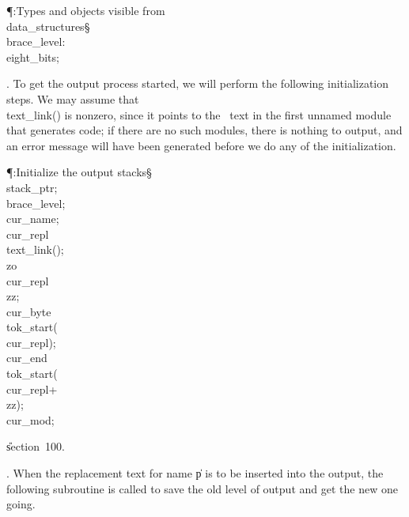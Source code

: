 \Y\P\?\4:Types and objects visible from \\{data\_structures}\X\mathrel{+}\S%
\?\6
\\{brace\_level}\?:\?\\{eight\_bits};\par
\fi

. To get the output process started, we will perform the following
initialization steps. We may assume that \\{text\_link}\?(\?)\? is nonzero,
since it
points to the \ADA\ text in the first unnamed module that generates code; if
there are no such modules, there is nothing to output, and an error message
will have been generated before we do any of the initialization.

\Y\P\?\4:Initialize the output stacks\X\S\?\6
\\{stack\_ptr}\?\K{};\5
\\{brace\_level}\?\K{};\5
\\{cur\_name}\?\K{};\5
\\{cur\_repl}\?\K\?\\{text\_link}\?\1(\?\2)\?;\5
\\{zo}\?\K\?\\{cur\_repl}\?\?\\{zz};\5
\\{cur\_byte}\?\K\?\\{tok\_start}\?\1(\?\\{cur\_repl}\?\2)\?;\5
\\{cur\_end}\?\K\?\\{tok\_start}\?\1(\?\\{cur\_repl}\?+\?\\{zz}\?\2)\?;\5
\\{cur\_mod}\?\K{};\par
\U section~100.\fi

. When the replacement text for name \|p is to be inserted into the output,
the following subroutine is called to save the old level of output and get
the new one going.

